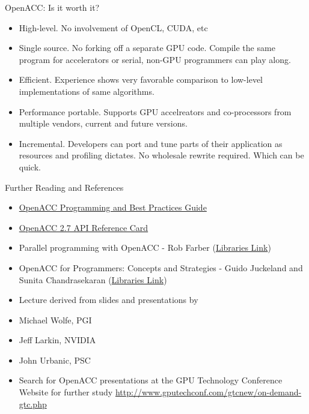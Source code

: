 \documentclass[10pt,t]{beamer}
\begin{document}
\begin{frame}{ OpenACC: Is it worth it?}
  \begin{itemize}
    \item High-level. No involvement of OpenCL, CUDA, etc
    \item Single source. No forking off a separate GPU code. Compile the same program for accelerators or serial, non-GPU programmers can play along.
    \item Efficient. Experience shows very favorable comparison to low-level implementations of same algorithms.
    \item Performance portable. Supports GPU accelreators and co-processors from multiple vendors, current and future versions.
    \item Incremental. Developers can port and tune parts of their application as resources and profiling dictates. No wholesale rewrite required. Which can be quick.
  \end{itemize}
\end{frame}

\begin{frame}{Further Reading and References}
  \begin{itemize}
    \item \href{https://www.openacc.org/sites/default/files/inline-files/OpenACC_Programming_Guide_0_0.pdf}{OpenACC Programming and Best Practices Guide }
    \item \href{https://www.openacc.org/sites/default/files/inline-files/API\%20Guide\%202.7.pdf}{OpenACC 2.7 API Reference Card}
    \item Parallel programming with OpenACC - Rob Farber (\href{https://asa.lib.lehigh.edu/Record/11244523}{Libraries Link})
    \item OpenACC for Programmers: Concepts and Strategies - Guido Juckeland and Sunita Chandrasekaran (\href{https://asa.lib.lehigh.edu/Record/11188103}{Libraries Link})
    \item[] Lecture derived from slides and presentations by
    \item Michael Wolfe, PGI
    \item Jeff Larkin, NVIDIA
    \item John Urbanic, PSC
    \item[] Search for OpenACC presentations at the GPU Technology Conference Website for further study \url{http://www.gputechconf.com/gtcnew/on-demand-gtc.php}
  \end{itemize}
\end{frame}
\end{document}
